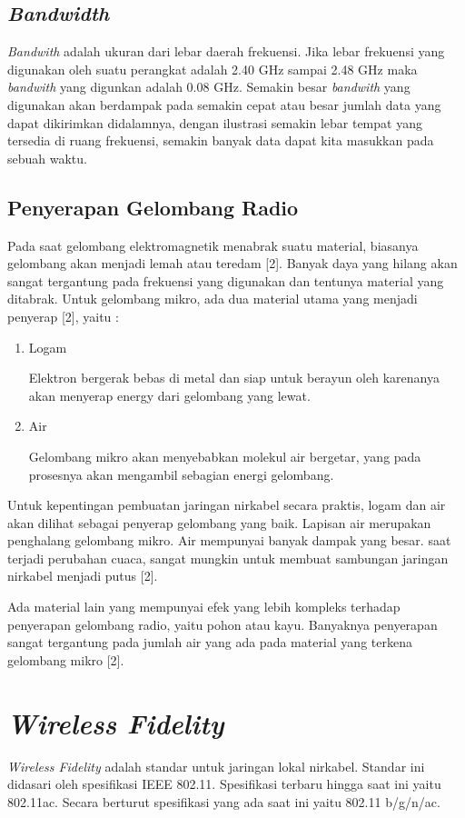 \documentclass[12pt,a4paper]{report}
\begin{document}
		\subsection{\emph{Bandwidth}}
		\emph{Bandwith} adalah ukuran dari lebar daerah frekuensi. Jika lebar frekuensi yang digunakan oleh suatu perangkat adalah 2.40 GHz sampai 2.48 GHz maka \emph{bandwith} yang digunkan adalah 0.08 GHz. Semakin besar \emph{bandwith} yang digunakan akan berdampak pada semakin cepat atau besar jumlah data yang dapat dikirimkan didalamnya, dengan ilustrasi semakin lebar tempat yang tersedia di ruang frekuensi, semakin banyak data dapat kita masukkan pada sebuah waktu.\cite{Hartono2011}
		\subsection{Penyerapan Gelombang Radio}
		Pada saat gelombang elektromagnetik menabrak suatu material, biasanya gelombang akan menjadi lemah atau teredam [2]. Banyak daya yang hilang akan sangat tergantung pada frekuensi yang digunakan dan tentunya material yang ditabrak. Untuk gelombang mikro, ada dua material utama yang menjadi penyerap [2], yaitu :
		\begin{enumerate}
			\item Logam
			
			Elektron bergerak bebas di metal dan siap untuk berayun oleh karenanya akan menyerap energy dari gelombang yang lewat.
			
			\item Air
			
			Gelombang mikro akan menyebabkan molekul air bergetar, yang pada prosesnya akan mengambil sebagian energi gelombang.
		\end{enumerate}
		Untuk kepentingan pembuatan jaringan nirkabel secara praktis, logam dan air akan dilihat sebagai penyerap gelombang yang baik. Lapisan air merupakan penghalang gelombang mikro. Air mempunyai banyak dampak yang besar. saat terjadi perubahan cuaca, sangat mungkin untuk membuat sambungan jaringan nirkabel menjadi putus [2].
		
		Ada material lain yang mempunyai efek yang lebih kompleks terhadap penyerapan gelombang radio, yaitu pohon atau kayu. Banyaknya penyerapan sangat tergantung pada jumlah air yang ada pada material yang terkena gelombang mikro [2].
		
		\section{\emph{Wireless Fidelity}}
		\emph{Wireless Fidelity} adalah standar untuk jaringan lokal nirkabel. Standar ini didasari oleh spesifikasi IEEE 802.11. Spesifikasi terbaru hingga saat ini yaitu 802.11ac. Secara berturut spesifikasi yang ada saat ini yaitu 802.11 b/g/n/ac.
		
\end{document}
